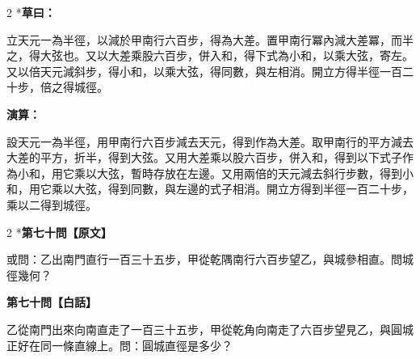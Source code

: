 \documentclass[11pt,a4paper]{article}
\newcommand{\tianyuan}[2]{\raisebox{-0.6ex}{\scriptsize$\begin{array}{c}#1\\\hline #2\end{array}$}}
\begin{document}
\vspace{0.1cm}
\noindent{}
\par\vspace{0.15cm}

\begin{paracol}{2}
\switchcolumn[0]*\textbf{草曰：}

\small 立天元一為半徑，以減於甲南行六百步，得\tianyuan{600}{1}為大差。置甲南行冪內減大差冪，而半之，得大弦也。又以大差乘股六百步，併入和，得下式為小和，以乘大弦，寄左。又以倍天元減斜步，得小和，以乘大弦，得同數，與左相消。開立方得半徑一百二十步，倍之得城徑。

\switchcolumn\textbf{演算：}

\small 設天元一為半徑，用甲南行六百步減去天元，得到\tianyuan{600}{1}作為大差。取甲南行的平方減去大差的平方，折半，得到大弦。又用大差乘以股六百步，併入和，得到以下式子作為小和，用它乘以大弦，暫時存放在左邊。又用兩倍的天元減去斜行步數，得到小和，用它乘以大弦，得到同數，與左邊的式子相消。開立方得到半徑一百二十步，乘以二得到城徑。
\end{paracol}

\vspace{0.1cm}
\noindent{}
\par\vspace{0.3cm}

\begin{paracol}{2}
\switchcolumn[0]*\noindent\textbf{第七十問【原文】}

\small 或問：乙出南門直行一百三十五步，甲從乾隅南行六百步望乙，與城參相直。問城徑幾何？

\switchcolumn\noindent\textbf{第七十問【白話】}

\small 乙從南門出來向南直走了一百三十五步，甲從乾角向南走了六百步望見乙，與圓城正好在同一條直線上。問：圓城直徑是多少？
\end{paracol}

\vspace{0.1cm}
\noindent{}
\par\vspace{0.15cm}
\end{document}
